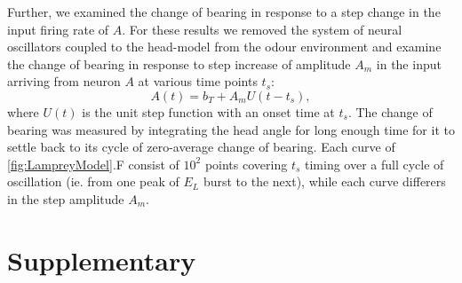 \documentclass[10pt,a4paper]{article}
\begin{document}
Further, we examined the change of bearing in response to a step change in the input firing rate of $A$. For these results we removed the system of neural oscillators coupled to the head-model from the odour environment and examine the change of bearing in response to step increase of amplitude $A_m$ in the input arriving from neuron $A$ at various time points $t_s$:
\begin{equation}
A(t) = b_T + A_m U(t-t_s),
\end{equation}
where $U(t)$ is the unit step function with an onset time at $t_s$. The change of bearing was measured by integrating the head angle for long enough time for it to settle back to its cycle of zero-average change of bearing. Each curve of \ref{fig:LampreyModel}.F consist of $10^2$ points covering $t_s$ timing over a full cycle of oscillation (ie. from one peak of $E_L$ burst to the next), while each curve differers in the step amplitude $A_m$.


\section{Supplementary}
\end{document}
